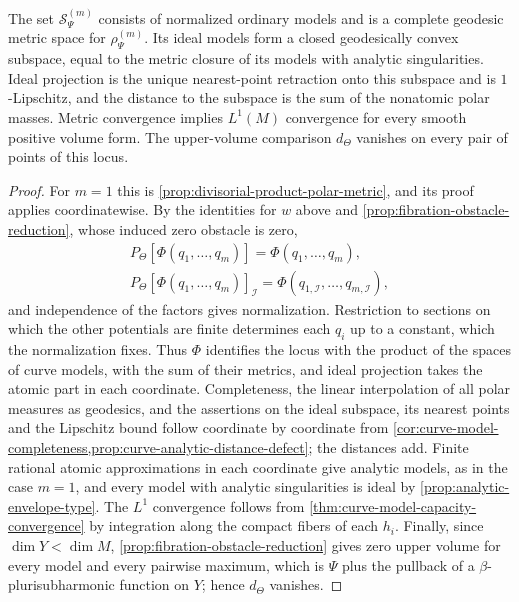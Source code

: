 \begin{proposition}\label{prop:separated-product-polar-metric}
The set $\mathcal S_\Psi^{(m)}$ consists of normalized ordinary models and is a complete geodesic metric space for $\rho_\Psi^{(m)}$. Its ideal models form a closed geodesically convex subspace, equal to the metric closure of its models with analytic singularities. Ideal projection is the unique nearest-point retraction onto this subspace and is $1$-Lipschitz, and the distance to the subspace is the sum of the nonatomic polar masses. Metric convergence implies $L^1(M)$ convergence for every smooth positive volume form. The upper-volume comparison $d_\Theta$ vanishes on every pair of points of this locus.
\end{proposition}
\begin{proof}
For $m=1$ this is \cref{prop:divisorial-product-polar-metric}, and its proof applies coordinatewise. By the identities for $w$ above and \cref{prop:fibration-obstacle-reduction}, whose induced zero obstacle is zero,
\[
 \begin{gathered}
 P_\Theta[\Phi(q_1,\ldots,q_m)]=\Phi(q_1,\ldots,q_m),\\
 P_\Theta[\Phi(q_1,\ldots,q_m)]_{\mathcal I}
       =\Phi(q_{1,\mathcal I},\ldots,q_{m,\mathcal I}),
 \end{gathered}
\]
and independence of the factors gives normalization. Restriction to sections on which the other potentials are finite determines each $q_i$ up to a constant, which the normalization fixes. Thus $\Phi$ identifies the locus with the product of the spaces of curve models, with the sum of their metrics, and ideal projection takes the atomic part in each coordinate. Completeness, the linear interpolation of all polar measures as geodesics, and the assertions on the ideal subspace, its nearest points and the Lipschitz bound follow coordinate by coordinate from \cref{cor:curve-model-completeness,prop:curve-analytic-distance-defect}; the distances add. Finite rational atomic approximations in each coordinate give analytic models, as in the case $m=1$, and every model with analytic singularities is ideal by \cref{prop:analytic-envelope-type}. The $L^1$ convergence follows from \cref{thm:curve-model-capacity-convergence} by integration along the compact fibers of each $h_i$. Finally, since $\dim Y<\dim M$, \cref{prop:fibration-obstacle-reduction} gives zero upper volume for every model and every pairwise maximum, which is $\Psi$ plus the pullback of a $\beta$-plurisubharmonic function on $Y$; hence $d_\Theta$ vanishes.
\end{proof}

